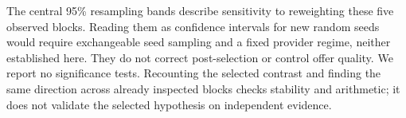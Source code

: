 The central 95\% resampling bands describe sensitivity to reweighting these five observed blocks. Reading them as confidence intervals for new random seeds would require exchangeable seed sampling and a fixed provider regime, neither established here. They do not correct post-selection or control offer quality. We report no significance tests. Recounting the selected contrast and finding the same direction across already inspected blocks checks stability and arithmetic; it does not validate the selected hypothesis on independent evidence.
